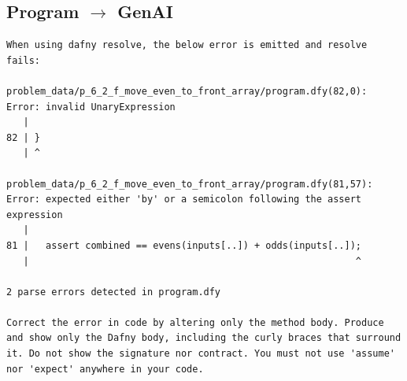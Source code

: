 \documentclass{article}
\begin{document}
\subsection*{Program $\rightarrow$ GenAI}
\begin{lstlisting}
When using dafny resolve, the below error is emitted and resolve fails:

problem_data/p_6_2_f_move_even_to_front_array/program.dfy(82,0): Error: invalid UnaryExpression
   |
82 | }
   | ^

problem_data/p_6_2_f_move_even_to_front_array/program.dfy(81,57): Error: expected either 'by' or a semicolon following the assert expression
   |
81 |   assert combined == evens(inputs[..]) + odds(inputs[..]);
   |                                                          ^

2 parse errors detected in program.dfy

Correct the error in code by altering only the method body. Produce and show only the Dafny body, including the curly braces that surround it. Do not show the signature nor contract. You must not use 'assume' nor 'expect' anywhere in your code.
\end{lstlisting}
\end{document}
